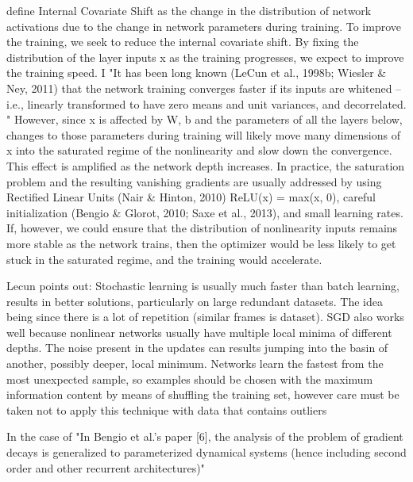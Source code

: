 
\cite{ioffe2015batch, 7005077}
define Internal Covariate Shift as the change in the
distribution of network activations due to the change in
network parameters during training. To improve the training, we seek to reduce the internal covariate shift. By
fixing the distribution of the layer inputs x as the training
progresses, we expect to improve the training speed. I
"It has
been long known (LeCun et al., 1998b; Wiesler \& Ney,
2011) that the network training converges faster if its inputs are whitened – i.e., linearly transformed to have zero means and unit variances, and decorrelated. "
However, since x is affected by
W, b and the parameters of all the layers below, changes
to those parameters during training will likely move many
dimensions of x into the saturated regime of the nonlinearity and slow down the convergence. This effect is
amplified as the network depth increases.
 In practice,
the saturation problem and the resulting vanishing gradients are usually addressed by using Rectified Linear Units
(Nair \& Hinton, 2010) ReLU(x) = max(x, 0), careful
initialization (Bengio \& Glorot, 2010; Saxe et al., 2013),
and small learning rates. If, however, we could ensure
that the distribution of nonlinearity inputs remains more
stable as the network trains, then the optimizer would be
less likely to get stuck in the saturated regime, and the
training would accelerate.

\cite{lecun2012efficient}
Lecun points out:
Stochastic learning is usually much faster than batch learning, results in better solutions, particularly on large redundant datasets. The idea being since there is a lot of repetition (similar frames is dataset). SGD also works well because nonlinear networks usually have multiple local minima of different depths. The noise present in the updates can results jumping into the basin of another, possibly deeper, local minimum. Networks learn the fastest from the most unexpected sample, so examples should be chosen with the maximum information content by means of shuffling the training set, however care must be taken not to apply this technique with data that contains outliers

In the case of "In Bengio et al.’s paper [6], the analysis of the problem of gradient decays
is generalized to parameterized dynamical systems (hence including second
order and other recurrent architectures)" \cite{hochreiter2001gradient}

